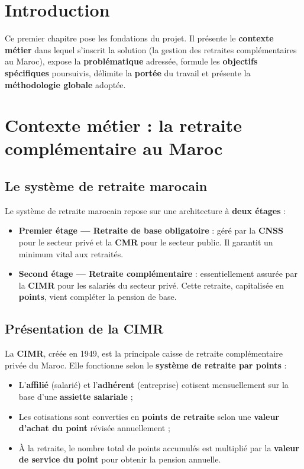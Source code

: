 \documentclass[12pt,a4paper,oneside]{report}
\begin{document}
\section{Introduction}
Ce premier chapitre pose les fondations du projet. Il présente le \textbf{contexte métier} dans lequel s'inscrit la solution (la gestion des retraites complémentaires au Maroc), expose la \textbf{problématique} adressée, formule les \textbf{objectifs spécifiques} poursuivis, délimite la \textbf{portée} du travail et présente la \textbf{méthodologie globale} adoptée.

\section{Contexte métier : la retraite complémentaire au Maroc}

\subsection{Le système de retraite marocain}
Le système de retraite marocain repose sur une architecture à \textbf{deux étages} :
\begin{itemize}
    \item \textbf{Premier étage --- Retraite de base obligatoire} : géré par la \textbf{CNSS} pour le secteur privé et la \textbf{CMR} pour le secteur public. Il garantit un minimum vital aux retraités.
    \item \textbf{Second étage --- Retraite complémentaire} : essentiellement assurée par la \textbf{CIMR} pour les salariés du secteur privé. Cette retraite, capitalisée en \textbf{points}, vient compléter la pension de base.
\end{itemize}

\subsection{Présentation de la CIMR}
La \textbf{CIMR}, créée en 1949, est la principale caisse de retraite complémentaire privée du Maroc. Elle fonctionne selon le \textbf{système de retraite par points} :
\begin{itemize}
    \item L'\textbf{affilié} (salarié) et l'\textbf{adhérent} (entreprise) cotisent mensuellement sur la base d'une \textbf{assiette salariale} ;
    \item Les cotisations sont converties en \textbf{points de retraite} selon une \textbf{valeur d'achat du point} révisée annuellement ;
    \item À la retraite, le nombre total de points accumulés est multiplié par la \textbf{valeur de service du point} pour obtenir la pension annuelle.
\end{itemize}
\end{document}
